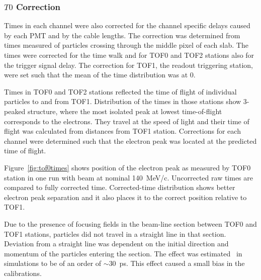 

\subsubsection{$T0$ Correction}

Times in each channel were also corrected for the channel specific
delays caused by each PMT and by the cable lengths. The correction was
determined from times measured of particles crossing through the
middle pixel of each slab. The times were corrected for the time walk
and for TOF0 and TOF2 stations also for the trigger signal delay. The
correction for TOF1, the readout triggering station, were set such
that the mean of the time distribution was at 0.

Times in TOF0 and TOF2 stations reflected the time of flight of
individual particles to and from TOF1. Distribution of the times in
those stations show 3-peaked structure, where the most isolated peak at
lowest time-of-flight corresponds to the electrons. They travel at the
speed of light and their time of flight was calculated from
distances from TOF1 station. Corrections for each channel were
determined such that the electron peak was located at the predicted
time of flight.

Figure~\ref{fig:tof0times} shows position of the electron peak as
measured by TOF0 station in one run with beam at nominal
140~MeV/c. Uncorrected raw times are compared to fully corrected
time. Corrected-time distribution shows better electron peak
separation and it also places it to the correct position relative to
TOF1.

Due to the presence of focusing fields in the beam-line section
between TOF0 and TOF1 stations, particles did not travel in a straight
line in that section. Deviation from a straight line was dependent on
the initial direction and momentum of the particles entering the
section. The effect was estimated~\cite{Rayner:2011zz} in
simulations to be of an order of $\sim$30~ps. This effect caused a
small bias in the calibrations.

